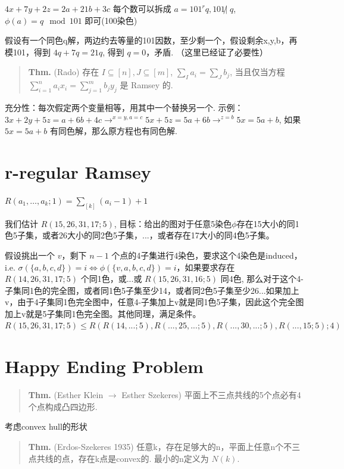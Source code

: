 $4x+7y+2z=2a+21b+3c$ 每个数可以拆成 $a=101^rq,101\not|\;q$, $\phi(a)=q\mod 101$ 即可(100染色)

假设有一个同色q解，两边约去等量的101因数，至少剩一个，假设剩余x,y,b，再模101，得到 $4q+7q=21q$, 得到 $q=0$，矛盾. （这里已经证了必要性）

\begin{quotation}
\textbf{Thm.} (Rado) 存在 $I\subseteq[n],J\subseteq[m]$, $\sum_Ia_i=\sum_Jb_j$, 当且仅当方程 $\sum_{i=1}^n a_ix_i=\sum_{j=1}^m b_jy_j$ 是 Ramsey 的.
\end{quotation}

充分性：每次假定两个变量相等，用其中一个替换另一个. 示例：$3x+2y+5z=a+6b+4c\to^{x=y,a=c}5x+5z=5a+6b\to^{z=b}5x=5a+b$, 如果 $5x=5a+b$ 有同色解，那么原方程也有同色解.


\section{r-regular Ramsey}

$R(a_1,\dots,a_k;1)=\sum_{[k]}(a_i-1)+1$

我们估计 $R(15,26,31,17;5)$, 目标：给出的图对于任意5染色$\phi$存在15大小的同1色5子集，或者26大小的同2色5子集，...，或者存在17大小的同4色5子集。

假设挑出一个 $v$，剩下 $n-1$ 个点的4子集进行4染色，要求这个4染色是induced，i.e. $\sigma(\{a,b,c,d\})=i\iff\phi(\{v,a,b,c,d\})=i$，如果要求存在 $R(14,26,31,17;5)$ 个同1色，或...或 $R(15,26,31,16;5)$ 同4色, 那么对于这个4-子集同1色的完全图，或者同1色5子集至少14，或者同2色5子集至少26...如果加上v，由于4子集同1色完全图中，任意4-子集加上v就是同1色5子集，因此这个完全图加上v就是5子集同1色完全图。其他同理，满足条件。$R(15,26,31,17;5)\leq R(R(14,...;5),R(...,25,...;5),R(...,30,...;5),R(...,15;5);4)$

\section{Happy Ending Problem}

\begin{quotation}
\textbf{Thm.} (Esther Klein $\to$ Esther Szekeres) 平面上不三点共线的5个点必有4个点构成凸四边形.
\end{quotation}

考虑convex hull的形状

\begin{quotation}
\textbf{Thm.} (Erdos-Szekeres 1935) 任意k，存在足够大的n，平面上任意n个不三点共线的点，存在k点是convex的. 最小的n定义为 $N(k)$.
\end{quotation}

